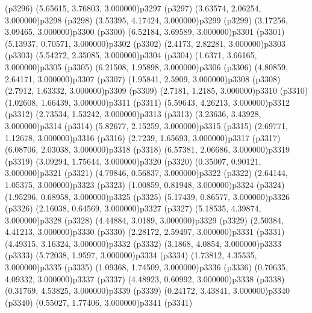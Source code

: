 \psdot(p3296)
\psPoint(5.65615, 3.76803, 3.000000){p3297}
\psdot(p3297)
\psPoint(3.63574, 2.06254, 3.000000){p3298}
\psdot(p3298)
\psPoint(3.53395, 4.17424, 3.000000){p3299}
\psdot(p3299)
\psPoint(3.17256, 3.09465, 3.000000){p3300}
\psdot(p3300)
\psPoint(6.52184, 3.69589, 3.000000){p3301}
\psdot(p3301)
\psPoint(5.13937, 0.70571, 3.000000){p3302}
\psdot(p3302)
\psPoint(2.4173, 2.82281, 3.000000){p3303}
\psdot(p3303)
\psPoint(5.54272, 2.35085, 3.000000){p3304}
\psdot(p3304)
\psPoint(1.6371, 3.66165, 3.000000){p3305}
\psdot(p3305)
\psPoint(6.21508, 1.95898, 3.000000){p3306}
\psdot(p3306)
\psPoint(4.80859, 2.64171, 3.000000){p3307}
\psdot(p3307)
\psPoint(1.95841, 2.5909, 3.000000){p3308}
\psdot(p3308)
\psPoint(2.7912, 1.63332, 3.000000){p3309}
\psdot(p3309)
\psPoint(2.7181, 1.2185, 3.000000){p3310}
\psdot(p3310)
\psPoint(1.02608, 1.66439, 3.000000){p3311}
\psdot(p3311)
\psPoint(5.59643, 4.26213, 3.000000){p3312}
\psdot(p3312)
\psPoint(2.73534, 1.53242, 3.000000){p3313}
\psdot(p3313)
\psPoint(3.23636, 3.43928, 3.000000){p3314}
\psdot(p3314)
\psPoint(5.82677, 2.15259, 3.000000){p3315}
\psdot(p3315)
\psPoint(2.69771, 1.12678, 3.000000){p3316}
\psdot(p3316)
\psPoint(2.7239, 1.65693, 3.000000){p3317}
\psdot(p3317)
\psPoint(6.08706, 2.03038, 3.000000){p3318}
\psdot(p3318)
\psPoint(6.57381, 2.06686, 3.000000){p3319}
\psdot(p3319)
\psPoint(3.09294, 1.75644, 3.000000){p3320}
\psdot(p3320)
\psPoint(0.35007, 0.90121, 3.000000){p3321}
\psdot(p3321)
\psPoint(4.79846, 0.56837, 3.000000){p3322}
\psdot(p3322)
\psPoint(2.64144, 1.05375, 3.000000){p3323}
\psdot(p3323)
\psPoint(1.00859, 0.81948, 3.000000){p3324}
\psdot(p3324)
\psPoint(1.95296, 0.68958, 3.000000){p3325}
\psdot(p3325)
\psPoint(5.17439, 0.86577, 3.000000){p3326}
\psdot(p3326)
\psPoint(2.16038, 0.64569, 3.000000){p3327}
\psdot(p3327)
\psPoint(5.18535, 4.39874, 3.000000){p3328}
\psdot(p3328)
\psPoint(4.44884, 3.0189, 3.000000){p3329}
\psdot(p3329)
\psPoint(2.50384, 4.41213, 3.000000){p3330}
\psdot(p3330)
\psPoint(2.28172, 2.59497, 3.000000){p3331}
\psdot(p3331)
\psPoint(4.49315, 3.16324, 3.000000){p3332}
\psdot(p3332)
\psPoint(3.1868, 4.0854, 3.000000){p3333}
\psdot(p3333)
\psPoint(5.72038, 1.9597, 3.000000){p3334}
\psdot(p3334)
\psPoint(1.73812, 4.35535, 3.000000){p3335}
\psdot(p3335)
\psPoint(1.09368, 1.74509, 3.000000){p3336}
\psdot(p3336)
\psPoint(0.70635, 4.09332, 3.000000){p3337}
\psdot(p3337)
\psPoint(4.48923, 0.60992, 3.000000){p3338}
\psdot(p3338)
\psPoint(0.31769, 4.53825, 3.000000){p3339}
\psdot(p3339)
\psPoint(0.24172, 3.43841, 3.000000){p3340}
\psdot(p3340)
\psPoint(0.55027, 1.77406, 3.000000){p3341}
\psdot(p3341)
